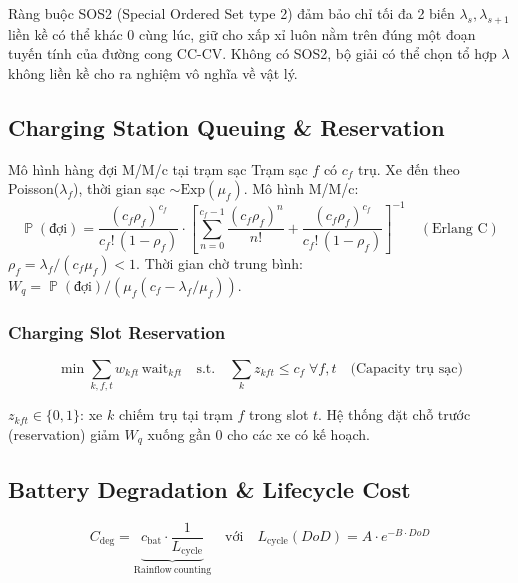\documentclass[12pt,a4paper]{article}
\DeclareMathOperator{\Prob}{\mathbb{P}}
\begin{document}
Ràng buộc SOS2 (Special Ordered Set type 2) đảm bảo chỉ tối đa 2 biến
$\lambda_s, \lambda_{s+1}$ liền kề có thể khác 0 cùng lúc, giữ cho
xấp xỉ luôn nằm trên đúng một đoạn tuyến tính của đường cong CC-CV.
Không có SOS2, bộ giải có thể chọn tổ hợp $\lambda$ không liền kề
cho ra nghiệm vô nghĩa về vật lý.

\subsection{Charging Station Queuing \& Reservation}

\begin{evbox}{Mô hình hàng đợi M/M/c tại trạm sạc}
Trạm sạc $f$ có $c_f$ trụ. Xe đến theo Poisson($\lambda_f$),
thời gian sạc $\sim\mathrm{Exp}(\mu_f)$. Mô hình M/M/c:
\begin{equation}
  \Prob(\text{đợi}) = \frac{(c_f\rho_f)^{c_f}}{c_f!\,(1-\rho_f)}\cdot
  \left[\sum_{n=0}^{c_f-1}\frac{(c_f\rho_f)^n}{n!}
        + \frac{(c_f\rho_f)^{c_f}}{c_f!\,(1-\rho_f)}\right]^{-1}
  \quad (\text{Erlang C})
\end{equation}
$\rho_f = \lambda_f/(c_f\mu_f) < 1$. Thời gian chờ trung bình:
$W_q = \Prob(\text{đợi})/(\mu_f(c_f-\lambda_f/\mu_f))$.
\end{evbox}

\subsubsection{Charging Slot Reservation}

\begin{equation}
  \min\sum_{k,f,t}w_{kft}\,\mathrm{wait}_{kft}
  \quad\text{s.t.}\quad
  \sum_k z_{kft} \leq c_f \;\forall f,t
  \quad\text{(Capacity trụ sạc)}
\end{equation}

$z_{kft}\in\{0,1\}$: xe $k$ chiếm trụ tại trạm $f$ trong slot $t$.
Hệ thống đặt chỗ trước (reservation) giảm $W_q$ xuống gần 0 cho các xe có kế hoạch.

\subsection{Battery Degradation \& Lifecycle Cost}

\begin{equation}
  C_{\mathrm{deg}} = \underbrace{c_{\mathrm{bat}}\cdot\frac{1}{L_{\mathrm{cycle}}}}_{\mathrm{Rainflow\ counting}}
  \quad\text{với}\quad
  L_{\mathrm{cycle}}(DoD) = A\cdot e^{-B\cdot DoD}
\end{equation}
\end{document}
